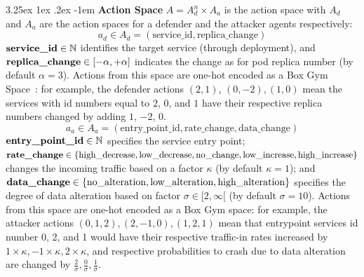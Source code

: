 \documentclass[conference]{IEEEtran}
\makeatletter
\renewcommand\paragraph{\@startsection{paragraph}{5}{\z@}%
  {3.25ex \@plus1ex \@minus.2ex}%
  {-1em}%
  {\normalfont\normalsize\bfseries}}
\makeatother
\begin{document}
\noindent \paragraph{\textbf{Action Space}} $A = A_d^n \times A_a$ is the action space with $A_d$ and $A_a$ are the action spaces for a defender and the attacker agents respectively:
$$
a_d \in A_d = (\text{service\_id}, \text{replica\_change})
$$
$\text{\textbf{service\_id}} \in \mathbb{N}$ identifies the target service (through deployment), and $\text{\textbf{replica\_change}} \in [-\alpha, +\alpha]$ indicates the change as for pod replica number (by default $\alpha = 3$). Actions from this space are one-hot encoded as a Box Gym Space~\cite{openAIGymActionSpaces}: for example, the defender actions $(2,1)$, $(0,-2), (1,0)$ mean the services with id numbers equal to $2$, $0$, and $1$ have their respective replica numbers changed by adding $1$, $-2$, $0$.
%
$$
a_a \in A_a = (\text{entry\_point\_id}, \text{rate\_change}, \text{data\_change})
$$
$\text{\textbf{entry\_point\_id}} \in \mathbb{N}$ specifies the service entry point;
$\text{\textbf{rate\_change}} \in \{\text{high\_decrease}, \text{low\_decrease}, \text{no\_change}, \allowbreak \text{low\_increase}, \allowbreak \text{high\_increase}\}$ changes the incoming traffic based on a factor $\kappa$ (by default $\kappa = 1$); and $\text{\textbf{data\_change}} \in \{\text{no\_alteration}, \allowbreak \text{low\_alteration}, \allowbreak \text{high\_alteration}\}$ specifies the degree of data alteration based on factor $\sigma \in [2,\infty[$ (by default $\sigma = 10$). Actions from this space are one-hot encoded as a Box Gym space: for example, the attacker actions $(0,1,2), (2,-1,0), (1,2,1)$ mean that entrypoint services id number 0, 2, and 1 would have their respective traffic-in rates increased by $1 \times \kappa, -1 \times \kappa, 2 \times \kappa$, and respective probabilities to crash due to data alteration are changed by $\frac{2}{\sigma}, \frac{0}{\sigma}, \frac{1}{\sigma}$.

\
\end{document}
